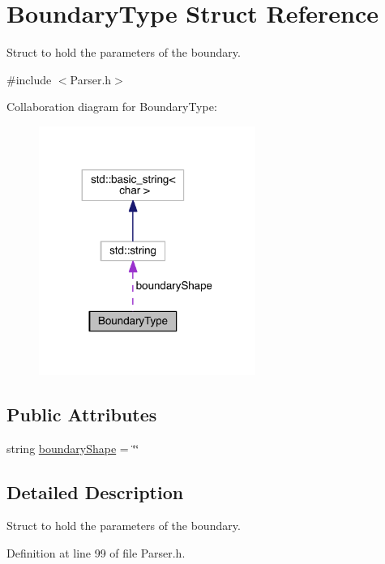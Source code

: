 \hypertarget{structBoundaryType}{\section{Boundary\+Type Struct Reference}
\label{structBoundaryType}
}


Struct to hold the parameters of the boundary.  




{\ttfamily \#include $<$Parser.\+h$>$}



Collaboration diagram for Boundary\+Type\+:\nopagebreak
\begin{figure}[H]
\begin{center}
\leavevmode
\includegraphics[width=200pt]{structBoundaryType__coll__graph}
\end{center}
\end{figure}
\subsection*{Public Attributes}
\begin{DoxyCompactItemize}
\item 
string \hyperlink{structBoundaryType_a1c437edf87bf307f6f7023ef8fe75f1f}{boundary\+Shape} = \char`\"{}\char`\"{}
\end{DoxyCompactItemize}


\subsection{Detailed Description}
Struct to hold the parameters of the boundary. 

Definition at line 99 of file Parser.\+h.



